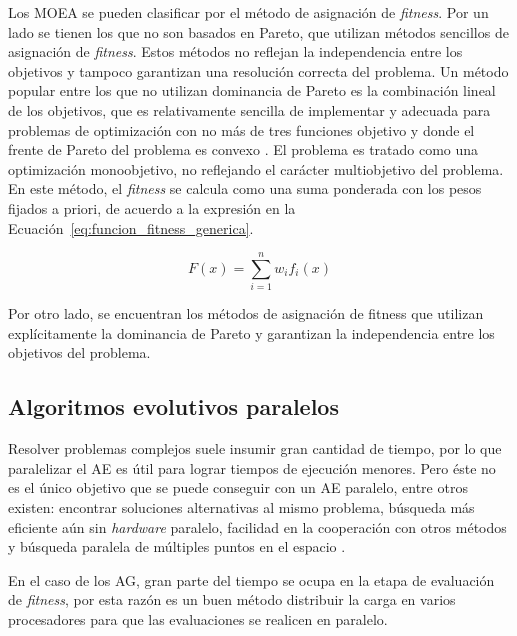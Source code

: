 Los MOEA se pueden clasificar por el método de asignación de \emph{fitness}. Por un lado se tienen los que no son basados en Pareto, que utilizan métodos sencillos de asignación de \emph{fitness}. Estos métodos no reflejan la independencia entre los objetivos y tampoco garantizan una resolución correcta del problema. Un método popular entre los que no utilizan dominancia de Pareto es la combinación lineal de los objetivos, que es relativamente sencilla de implementar y adecuada para problemas de optimización con no más de tres funciones objetivo y donde el frente de Pareto del problema es convexo \citep{coello2002evolutionary}. El problema es tratado como una optimización monoobjetivo, no reflejando el carácter multiobjetivo del problema. En este método, el \emph{fitness} se calcula como una suma ponderada con los pesos fijados a priori, de acuerdo a la expresión en la Ecuación~\ref{eq:funcion_fitness_generica}.

\begin{equation}
\label{eq:funcion_fitness_generica}
F(x) = \sum_{i=1}^{n}{w_i}{f_i}(x)
\end{equation}


Por otro lado, se encuentran los métodos de asignación de fitness que utilizan explícitamente la dominancia de Pareto y garantizan la  independencia entre los objetivos del problema.   

\subsection{Algoritmos evolutivos paralelos}
Resolver problemas complejos suele insumir gran cantidad de tiempo, por lo que paralelizar el AE es útil para lograr tiempos de ejecución menores. Pero éste no es el único objetivo que se puede conseguir con un AE paralelo, entre otros existen: encontrar soluciones alternativas al mismo problema, búsqueda más eficiente aún sin \emph{hardware} paralelo, facilidad en la cooperación con otros métodos y búsqueda paralela de múltiples puntos en el espacio \citep{Alba2002}. 

En el caso de los AG, gran parte del tiempo se ocupa en la etapa de evaluación de \emph{fitness}, por esta razón es un buen método distribuir la carga en varios procesadores para que las evaluaciones se realicen en paralelo. 

